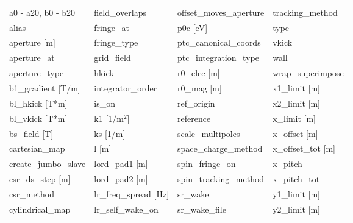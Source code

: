  \begin{tabular}{llll} \toprule
a0 - a20, b0 - b20               & field_overlaps                   & offset_moves_aperture            & tracking_method                  \\
alias                            & fringe_at                        & p0c [eV]                         & type                             \\
aperture [m]                     & fringe_type                      & ptc_canonical_coords             & vkick                            \\
aperture_at                      & grid_field                       & ptc_integration_type             & wall                             \\
aperture_type                    & hkick                            & r0_elec [m]                      & wrap_superimpose                 \\
b1_gradient [T/m]                & integrator_order                 & r0_mag [m]                       & x1_limit [m]                     \\
bl_hkick [T*m]                   & is_on                            & ref_origin                       & x2_limit [m]                     \\
bl_vkick [T*m]                   & k1 [1/m$^2$]                     & reference                        & x_limit [m]                      \\
bs_field [T]                     & ks [1/m]                         & scale_multipoles                 & x_offset [m]                     \\
cartesian_map                    & l [m]                            & space_charge_method              & x_offset_tot [m]                 \\
create_jumbo_slave               & lord_pad1 [m]                    & spin_fringe_on                   & x_pitch                          \\
csr_ds_step [m]                  & lord_pad2 [m]                    & spin_tracking_method             & x_pitch_tot                      \\
csr_method                       & lr_freq_spread [Hz]              & sr_wake                          & y1_limit [m]                     \\
cylindrical_map                  & lr_self_wake_on                  & sr_wake_file                     & y2_limit [m]                     \\

\end{tabular}
